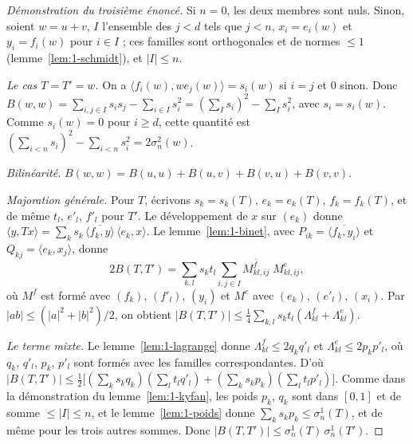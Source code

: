 \begin{proof}[Démonstration du troisième énoncé]
Si $n = 0$, les deux membres sont nuls. Sinon, soient $w = u + v$, $I$ l'ensemble des $j < d$ tels que $j < n$, $x_i = e_i(w)$ et $y_i = f_i(w)$ pour $i \in I$ ; ces familles sont orthogonales et de normes $\leq 1$ (lemme~\ref{lem:1-schmidt}), et $|I| \leq n$.

\emph{Le cas $T = T' = w$.} On a $\langle f_i(w), w e_j(w)\rangle = s_i(w)$ si $i = j$ et $0$ sinon. Donc $B(w, w) = \sum_{i,j \in I} s_is_j - \sum_{i \in I} s_i^2 = (\sum_I s_i)^2 - \sum_I s_i^2$, avec $s_i = s_i(w)$. Comme $s_i(w) = 0$ pour $i \geq d$, cette quantité est $(\sum_{i<n} s_i)^2 - \sum_{i<n} s_i^2 = 2\sigma_n^2(w)$.

\emph{Bilinéarité.} $B(w, w) = B(u,u) + B(u,v) + B(v,u) + B(v,v)$.

\emph{Majoration générale.} Pour $T$, écrivons $s_k = s_k(T)$, $e_k = e_k(T)$, $f_k = f_k(T)$, et de même $t_l$, $e'_l$, $f'_l$ pour $T'$. Le développement de $x$ sur $(e_k)$ donne $\langle y, Tx\rangle = \sum_k s_k\, \overline{\langle f_k, y\rangle}\, \langle e_k, x\rangle$. Le lemme~\ref{lem:1-binet}, avec $P_{ik} = \overline{\langle f_k, y_i\rangle}$ et $Q_{kj} = \langle e_k, x_j\rangle$, donne
\[
  2B(T, T') = \sum_{k,l} s_k t_l \sum_{i,j \in I} \overline{M^f_{kl,ij}}\; M^e_{kl,ij},
\]
où $M^f$ est formé avec $(f_k)$, $(f'_l)$, $(y_i)$ et $M^e$ avec $(e_k)$, $(e'_l)$, $(x_i)$. Par $|ab| \leq (|a|^2 + |b|^2)/2$, on obtient $|B(T, T')| \leq \frac14 \sum_{k,l} s_k t_l (\Lambda^f_{kl} + \Lambda^e_{kl})$.

\emph{Le terme mixte.} Le lemme~\ref{lem:1-lagrange} donne $\Lambda^f_{kl} \leq 2 q_k q'_l$ et $\Lambda^e_{kl} \leq 2 p_k p'_l$, où $q_k$, $q'_l$, $p_k$, $p'_l$ sont formés avec les familles correspondantes. D'où $|B(T, T')| \leq \frac12 \bigl[ (\sum_k s_k q_k)(\sum_l t_l q'_l) + (\sum_k s_k p_k)(\sum_l t_l p'_l) \bigr]$. Comme dans la démonstration du lemme~\ref{lem:1-kyfan}, les poids $p_k$, $q_k$ sont dans $[0,1]$ et de somme $\leq |I| \leq n$, et le lemme~\ref{lem:1-poids} donne $\sum_k s_k p_k \leq \sigma_n^1(T)$, et de même pour les trois autres sommes. Donc $|B(T, T')| \leq \sigma_n^1(T)\,\sigma_n^1(T')$.


\end{proof}
